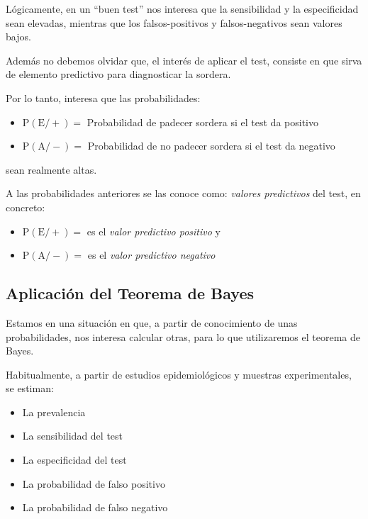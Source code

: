 \documentclass[
  a4paper,
  DIV=11,
  numbers=noendperiod]{scrreprt}
\begin{document}
Lógicamente, en un ``buen test'' nos interesa que la sensibilidad y la
especificidad sean elevadas, mientras que los falsos-positivos y
falsos-negativos sean valores bajos.

Además no debemos olvidar que, el interés de aplicar el test, consiste
en que sirva de elemento predictivo para diagnosticar la sordera.

Por lo tanto, interesa que las probabilidades:

\begin{itemize}
\item
  \(\mathrm{P}(\mathrm{E} /+)=\) Probabilidad de padecer sordera si el
  test da positivo
\item
  \(\mathrm{P}(\mathrm{A} /-)=\) Probabilidad de no padecer sordera si
  el test da negativo
\end{itemize}

sean realmente altas.

A las probabilidades anteriores se las conoce como: \emph{valores
predictivos} del test, en concreto:

\begin{itemize}
\item
  \(\mathrm{P}(\mathrm{E} /+)=\) es el \emph{valor predictivo positivo}
  y
\item
  \(\mathrm{P}(\mathrm{A} /-)=\) es el \emph{valor predictivo negativo}
\end{itemize}

\subsection{Aplicación del Teorema de
Bayes}\label{aplicaciuxf3n-del-teorema-de-bayes}

Estamos en una situación en que, a partir de conocimiento de unas
probabilidades, nos interesa calcular otras, para lo que utilizaremos el
teorema de Bayes.

Habitualmente, a partir de estudios epidemiológicos y muestras
experimentales, se estiman:

\begin{itemize}
\item
  La prevalencia
\item
  La sensibilidad del test
\item
  La especificidad del test
\item
  La probabilidad de falso positivo
\item
  La probabilidad de falso negativo
\end{itemize}
\end{document}
